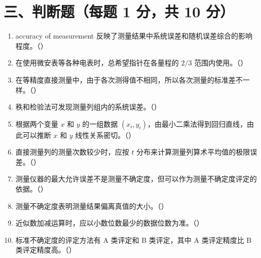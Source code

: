 \documentclass[UTF8,12pt,a4paper]{ctexart}
\begin{document}
\newpage

\section*{三、判断题（每题 1 分，共 10 分）}
\begin{enumerate}[label=\arabic*、]
\item accuracy of measurement 反映了测量结果中系统误差和随机误差综合的影响程度。（\quad）
\item 在使用微安表等各种电表时，总希望指针在各量程的 $2/3$ 范围内使用。（\quad）
\item 在等精度直接测量中，由于各次测得值不相同，所以各次测量的标准差不一样。（\quad）
\item 秩和检验法可发现测量列组内的系统误差。（\quad）
\item 根据两个变量 $x$ 和 $y$ 的一组数据 $(x_i,y_i)$，由最小二乘法得到回归直线，由此可以推断 $x$ 和 $y$ 线性关系密切。（\quad）
\item 直接测量列的测量次数较少时，应按 $t$ 分布来计算测量列算术平均值的极限误差。（\quad）
\item 测量仪器的最大允许误差不是测量不确定度，但可以作为测量不确定度评定的依据。（\quad）
\item 测量不确定度表明测量结果偏离真值的大小。（\quad）
\item 近似数加减运算时，应以小数位数最少的数据位数为准。（\quad）
\item 标准不确定度的评定方法有 A 类评定和 B 类评定，其中 A 类评定精度比 B 类评定精度高。（\quad）
\end{enumerate}

\newpage
\end{document}
